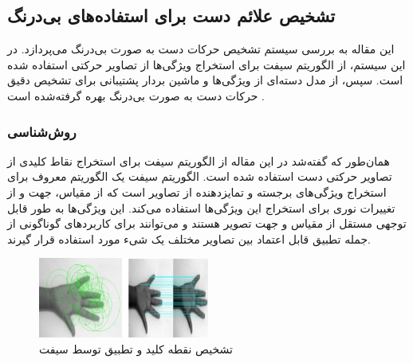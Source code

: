 
\subsection {تشخيص علائم دست برای استفاده‌های بی‌درنگ}
این مقاله به بررسی سیستم تشخیص حرکات دست به صورت بی‌درنگ می‌پردازد. در این سیستم، از الگوریتم سیفت  برای استخراج ویژگی‌ها از تصاویر حرکتی استفاده شده است. سپس، از مدل دسته‌ای از ویژگی‌ها  و ماشین بردار پشتیبانی برای تشخیص دقیق حرکات دست به صورت بی‌درنگ بهره گرفته‌شده‌ است \cite{murugeswari2014hand}.


\subsubsection{روش‌شناسی}
همان‌طور که گفته‌شد در این مقاله از الگوریتم سیفت  برای استخراج نقاط کلیدی از تصاویر حرکتی دست استفاده شده است. الگوریتم سیفت یک الگوریتم معروف برای استخراج ویژگی‌های برجسته 
و تمایزدهنده از تصاویر است که از مقیاس، جهت و از تغییرات نوری برای استخراج این ویژگی‌ها استفاده می‌کند. این ویژگی‌ها به طور قابل توجهی مستقل از 
مقیاس و جهت تصویر هستند و می‌توانند برای کاربرد‌های گوناگونی از جمله تطبیق قابل اعتماد بین تصاویر مختلف یک شیء مورد استفاده قرار گیرند.

\begin{figure}[h]
    \centering
    \includegraphics[width=0.5\textwidth]{SIFT.png}
    \caption[تشخیص نقطه کلید و تطبیق توسط سیفت ]{تشخیص نقطه کلید و تطبیق توسط سیفت \cite{murugeswari2014hand}}
\end{figure}


